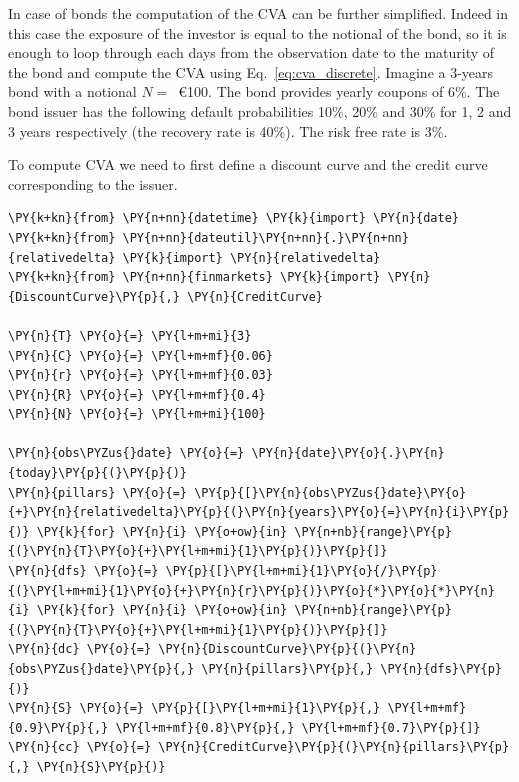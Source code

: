 In case of bonds the computation of the CVA can be further simplified. Indeed in this case the exposure of the investor is equal to the notional of the bond, so it is enough to loop through each days from the observation date to the maturity of the bond and compute the CVA using Eq.~\ref{eq:cva_discrete}.
Imagine a 3-years bond with a notional $N=$~\euro{100}. The bond provides yearly coupons of 6\%. The bond issuer has the following default probabilities 10\%, 20\% and 30\% for 1, 2 and 3 years respectively (the recovery rate is 40\%). The risk free rate is 3\%. 

To compute CVA we need to first define a discount curve and the credit curve corresponding to the issuer. 

\begin{tcolorbox}[breakable, size=fbox, boxrule=1pt, pad at break*=1mm,colback=cellbackground, colframe=cellborder]
\begin{Verbatim}[commandchars=\\\{\}]
\PY{k+kn}{from} \PY{n+nn}{datetime} \PY{k}{import} \PY{n}{date}
\PY{k+kn}{from} \PY{n+nn}{dateutil}\PY{n+nn}{.}\PY{n+nn}{relativedelta} \PY{k}{import} \PY{n}{relativedelta}
\PY{k+kn}{from} \PY{n+nn}{finmarkets} \PY{k}{import} \PY{n}{DiscountCurve}\PY{p}{,} \PY{n}{CreditCurve}
	
\PY{n}{T} \PY{o}{=} \PY{l+m+mi}{3} 
\PY{n}{C} \PY{o}{=} \PY{l+m+mf}{0.06}
\PY{n}{r} \PY{o}{=} \PY{l+m+mf}{0.03}
\PY{n}{R} \PY{o}{=} \PY{l+m+mf}{0.4}
\PY{n}{N} \PY{o}{=} \PY{l+m+mi}{100}
	
\PY{n}{obs\PYZus{}date} \PY{o}{=} \PY{n}{date}\PY{o}{.}\PY{n}{today}\PY{p}{(}\PY{p}{)}
\PY{n}{pillars} \PY{o}{=} \PY{p}{[}\PY{n}{obs\PYZus{}date}\PY{o}{+}\PY{n}{relativedelta}\PY{p}{(}\PY{n}{years}\PY{o}{=}\PY{n}{i}\PY{p}{)} \PY{k}{for} \PY{n}{i} \PY{o+ow}{in} \PY{n+nb}{range}\PY{p}{(}\PY{n}{T}\PY{o}{+}\PY{l+m+mi}{1}\PY{p}{)}\PY{p}{]}
\PY{n}{dfs} \PY{o}{=} \PY{p}{[}\PY{l+m+mi}{1}\PY{o}{/}\PY{p}{(}\PY{l+m+mi}{1}\PY{o}{+}\PY{n}{r}\PY{p}{)}\PY{o}{*}\PY{o}{*}\PY{n}{i} \PY{k}{for} \PY{n}{i} \PY{o+ow}{in} \PY{n+nb}{range}\PY{p}{(}\PY{n}{T}\PY{o}{+}\PY{l+m+mi}{1}\PY{p}{)}\PY{p}{]}
\PY{n}{dc} \PY{o}{=} \PY{n}{DiscountCurve}\PY{p}{(}\PY{n}{obs\PYZus{}date}\PY{p}{,} \PY{n}{pillars}\PY{p}{,} \PY{n}{dfs}\PY{p}{)}
\PY{n}{S} \PY{o}{=} \PY{p}{[}\PY{l+m+mi}{1}\PY{p}{,} \PY{l+m+mf}{0.9}\PY{p}{,} \PY{l+m+mf}{0.8}\PY{p}{,} \PY{l+m+mf}{0.7}\PY{p}{]}
\PY{n}{cc} \PY{o}{=} \PY{n}{CreditCurve}\PY{p}{(}\PY{n}{pillars}\PY{p}{,} \PY{n}{S}\PY{p}{)}
\end{Verbatim}
\end{tcolorbox}

